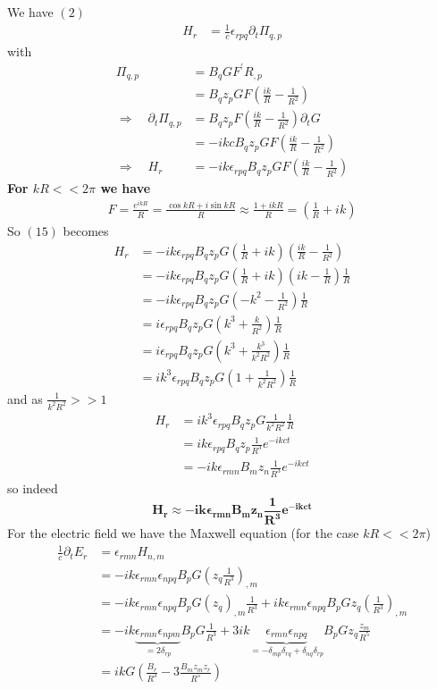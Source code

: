 We have $(2)$ 
\begin{align}
H_r&= \frac{1}{c}\epsilon_{rpq}\partial_t\Pi_{q,p}
\end{align}
with 
\begin{align}
\Pi_{q,p}&= B_qGF^{'}R_{,p}\\
&= B_qz_pGF\left(\frac{ik}{R}-\frac{1}{R^2}\right)\\
\Rightarrow\quad \partial_{t}\Pi_{q,p}&=  B_qz_pF\left(\frac{ik}{R}-\frac{1}{R^2}\right)\partial_{t}G\\
&=  -ikcB_qz_pGF\left(\frac{ik}{R}-\frac{1}{R^2}\right)\\
\Rightarrow\quad H_r&=  -ik\epsilon_{rpq}B_qz_pGF\left(\frac{ik}{R}-\frac{1}{R^2}\right)
\end{align}
\textbf{For $kR << 2\pi$ we have}
\begin{align}
F= \frac{e^{ikR}}{R}= \frac{\cos kR+i\sin kR}{R}\approx\frac{1+ikR}{R}= \left(\frac{1}{R}+ik\right)
\end{align}
So $(15)$ becomes
\begin{align}
H_r&=  -ik\epsilon_{rpq}B_qz_pG\left(\frac{1}{R}+ik\right)\left(\frac{ik}{R}-\frac{1}{R^2}\right)\\
&= -ik\epsilon_{rpq}B_qz_pG\left(\frac{1}{R}+ik\right)\left(ik-\frac{1}{R}\right)\frac{1}{R}\\
&= -ik\epsilon_{rpq}B_qz_pG\left(-k^2-\frac{1}{R^2}\right)\frac{1}{R}\\
&= i\epsilon_{rpq}B_qz_pG\left(k^3+\frac{k}{R^2}\right)\frac{1}{R}\\
&= i\epsilon_{rpq}B_qz_pG\left(k^3+\frac{k^3}{k^2R^2}\right)\frac{1}{R}\\
&= ik^3\epsilon_{rpq}B_qz_pG\left(1+\frac{1}{k^2R^2}\right)\frac{1}{R}
\end{align}
and as $\frac{1}{k^2R^2}>>1$
\begin{align}
H_r&= ik^3\epsilon_{rpq}B_qz_pG\frac{1}{k^2R^2}\frac{1}{R}\\
&= ik\epsilon_{rpq}B_qz_p\frac{1}{R^3}e^{-ikct}\\
&= -ik\epsilon_{rmn}B_mz_n\frac{1}{R^3}e^{-ikct}
\end{align}
so indeed $$\mathbf{H_r\approx -ik\epsilon_{rmn}B_mz_n\frac{1}{R^3}e^{-ikct}}$$
For the electric field we have the Maxwell equation (for the case $kR << 2\pi$) 
\begin{align}
\frac{1}{c}\partial_t E_r &= \epsilon_{rmn}H_{n,m}\\
&= -ik\epsilon_{rmn}\epsilon_{npq}B_pG\left(z_q\frac{1}{R^3}\right)_{,m}\\
&= -ik\epsilon_{rmn}\epsilon_{npq}B_pG\left(z_q\right)_{,m}\frac{1}{R^3}+ik\epsilon_{rmn}\epsilon_{npq}B_pGz_q\left(\frac{1}{R^3}\right)_{,m}\\
&= -ik\underbrace{\epsilon_{rmn}\epsilon_{npm}}_{= 2\delta_{rp}}B_pG\frac{1}{R^3}+3ik\underbrace{\epsilon_{rmn}\epsilon_{npq}}_{= -\delta_{mp}\delta_{rq}+\delta_{nq}\delta_{rp}}B_pGz_q\frac{z_m}{R^5}\\
&= ikG\left(\frac{B_r}{R^3} -3\frac{B_mz_mz_r}{R^5}\right)
\end{align}
